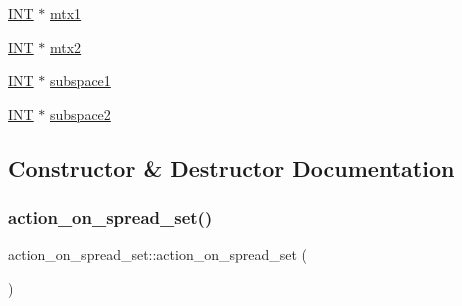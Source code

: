 \begin{DoxyCompactItemize}
\item 
\mbox{\hyperlink{galois_8h_a09fddde158a3a20bd2dcadb609de11dc}{I\+NT}} $\ast$ \mbox{\hyperlink{classaction__on__spread__set_a658dcadbc44bf528c5028b3ffb9882d9}{mtx1}}
\item 
\mbox{\hyperlink{galois_8h_a09fddde158a3a20bd2dcadb609de11dc}{I\+NT}} $\ast$ \mbox{\hyperlink{classaction__on__spread__set_a5bd191e86ed7bfefb4699b608da5f65a}{mtx2}}
\item 
\mbox{\hyperlink{galois_8h_a09fddde158a3a20bd2dcadb609de11dc}{I\+NT}} $\ast$ \mbox{\hyperlink{classaction__on__spread__set_a779647b44e8606be1eaa7336850223cf}{subspace1}}
\item 
\mbox{\hyperlink{galois_8h_a09fddde158a3a20bd2dcadb609de11dc}{I\+NT}} $\ast$ \mbox{\hyperlink{classaction__on__spread__set_af3cd8ca117ab6a9b21e7ab24ea07634b}{subspace2}}
\end{DoxyCompactItemize}


\subsection{Constructor \& Destructor Documentation}
\mbox{\label{classaction__on__spread__set_ad7bf9accd7523d3f686eaaf257acdde2}} 
\subsubsection{\texorpdfstring{action\+\_\+on\+\_\+spread\+\_\+set()}{action\_on\_spread\_set()}}
{\footnotesize\ttfamily action\+\_\+on\+\_\+spread\+\_\+set\+::action\+\_\+on\+\_\+spread\+\_\+set (\begin{DoxyParamCaption}{ }\end{DoxyParamCaption})}

\mbox{\label{classaction__on__spread__set_aaf42a542a1e5cf6a6735dfdf35a9d29e}} 
